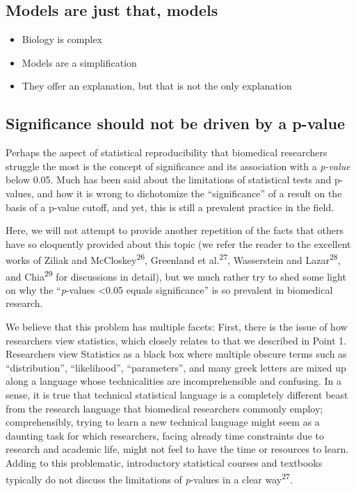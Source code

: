 \documentclass[smallextended]{svjour3}       %
\begin{document}
\normalsize

\hypertarget{models-are-just-that-models}{%
\subsection{Models are just that,
models}\label{models-are-just-that-models}}

\begin{itemize}
\item
  Biology is complex
\item
  Models are a simplification
\item
  They offer an explanation, but that is not the only explanation
\end{itemize}

\hypertarget{significance-should-not-be-driven-by-a-p-value}{%
\subsection{Significance should not be driven by a
p-value}\label{significance-should-not-be-driven-by-a-p-value}}

Perhaps the aspect of statistical reproducibility that biomedical
researchers struggle the most is the concept of significance and its
association with a \emph{p-value} below 0.05. Much has been said about
the limitations of statistical tests and p-values, and how it is wrong
to dichotomize the ``significance'' of a result on the basis of a
p-value cutoff, and yet, this is still a prevalent practice in the
field.

Here, we will not attempt to provide another repetition of the facts
that others have so eloquently provided about this topic (we refer the
reader to the excellent works of Ziliak and
McCloskey\textsuperscript{26}, Greenland et al.\textsuperscript{27},
Wasserstein and Lazar\textsuperscript{28}, and Chia\textsuperscript{29}
for discussions in detail), but we much rather try to shed some light on
why the ``\emph{p}-values \textless0.05 equals significance'' is so
prevalent in biomedical research.

We believe that this problem has multiple facets: First, there is the
issue of how researchers view statistics, which closely relates to that
we described in Point 1. Researchers view Statistics as a black box
where multiple obscure terms such as ``distribution'', ``likelihood'',
``parameters'', and many greek letters are mixed up along a language
whose technicalities are incomprehensible and confusing. In a sense, it
is true that technical statistical language is a completely different
beast from the research language that biomedical researchers commonly
employ; comprehensibly, trying to learn a new technical language might
seem as a daunting task for which researchers, facing already time
constraints due to research and academic life, might not feel to have
the time or resources to learn. Adding to this problematic, introductory
statistical courses and textbooks typically do not discuss the
limitations of \emph{p}-values in a clear way\textsuperscript{27}.
\end{document}
